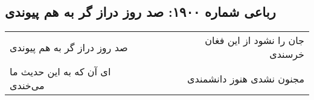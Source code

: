 \begin{center}
\section*{رباعی شماره ۱۹۰۰: صد روز دراز گر به هم پیوندی}
\label{sec:1900}
\begin{longtable}{l p{0.5cm} r}
صد روز دراز گر به هم پیوندی
&&
جان را نشود از این فغان خرسندی
\\
ای آن که به این حدیث ما می‌خندی
&&
مجنون نشدی هنوز دانشمندی
\\
\end{longtable}
\end{center}
